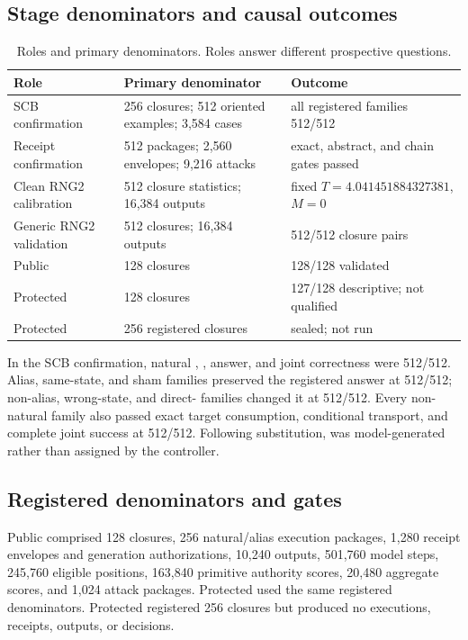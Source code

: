 \subsection{Stage denominators and causal outcomes}
\begin{table}[H]
\caption{Roles and primary denominators. Roles answer different prospective questions.}
\centering
\small
\begin{tabularx}{\linewidth}{@{}lYY@{}}
\toprule
Role & Primary denominator & Outcome \\
\midrule
SCB confirmation & 256 closures; 512 oriented examples; 3,584 cases & all registered families 512/512 \\
Receipt confirmation & 512 packages; 2,560 envelopes; 9,216 attacks & exact, abstract, and chain gates passed \\
Clean RNG2 calibration & 512 closure statistics; 16,384 outputs & fixed $T=4.041451884327381$, $M=0$ \\
Generic RNG2 validation & 512 closures; 16,384 outputs & 512/512 closure pairs \\
Public \intvone{} & 128 closures & 128/128 validated \\
Protected \intqone{} & 128 closures & 127/128 descriptive; not qualified \\
Protected \intcone{} & 256 registered closures & sealed; not run \\
\bottomrule
\end{tabularx}
\end{table}

In the SCB confirmation, natural \ztwo{}, \zthree{}, answer, and joint correctness were 512/512. Alias, same-state, and sham families preserved the registered answer at 512/512; non-alias, wrong-state, and direct-\zthree{} families changed it at 512/512. Every non-natural family also passed exact target consumption, conditional transport, and complete joint success at 512/512. Following \ztwo{} substitution, \zthree{} was model-generated rather than assigned by the controller.

\subsection{Registered denominators and gates}
Public \intvone{} comprised 128 closures, 256 natural/alias execution packages, 1,280 receipt envelopes and generation authorizations, 10,240 outputs, 501,760 model steps, 245,760 eligible positions, 163,840 primitive authority scores, 20,480 aggregate scores, and 1,024 attack packages. Protected \intqone{} used the same registered denominators. Protected \intcone{} registered 256 closures but produced no executions, receipts, outputs, or decisions.

